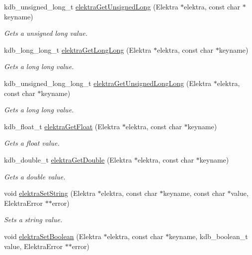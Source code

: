 \begin{DoxyCompactItemize}
kdb\+\_\+unsigned\+\_\+long\+\_\+t \hyperlink{group__highlevel_gabd5a96b1c280fcf74509b1262ee339b6}{elektra\+Get\+Unsigned\+Long} (Elektra $\ast$elektra, const char $\ast$keyname)
\begin{DoxyCompactList}\small\item\em Gets a unsigned long value. \end{DoxyCompactList}\item 
kdb\+\_\+long\+\_\+long\+\_\+t \hyperlink{group__highlevel_ga6085eb6cbf16ce5e7b0b64db0f77efea}{elektra\+Get\+Long\+Long} (Elektra $\ast$elektra, const char $\ast$keyname)
\begin{DoxyCompactList}\small\item\em Gets a long long value. \end{DoxyCompactList}\item 
kdb\+\_\+unsigned\+\_\+long\+\_\+long\+\_\+t \hyperlink{group__highlevel_gadfb09825268f0b9215d7bb27c4068e4d}{elektra\+Get\+Unsigned\+Long\+Long} (Elektra $\ast$elektra, const char $\ast$keyname)
\begin{DoxyCompactList}\small\item\em Gets a long long value. \end{DoxyCompactList}\item 
kdb\+\_\+float\+\_\+t \hyperlink{group__highlevel_gab7cb28352ab7a503c232c5dbff45ddde}{elektra\+Get\+Float} (Elektra $\ast$elektra, const char $\ast$keyname)
\begin{DoxyCompactList}\small\item\em Gets a float value. \end{DoxyCompactList}\item 
kdb\+\_\+double\+\_\+t \hyperlink{group__highlevel_ga878f4ef3ecbfacca6afbdb97c1da7943}{elektra\+Get\+Double} (Elektra $\ast$elektra, const char $\ast$keyname)
\begin{DoxyCompactList}\small\item\em Gets a double value. \end{DoxyCompactList}\item 
void \hyperlink{group__highlevel_ga563a695658e8e6f74183cca674edd1a7}{elektra\+Set\+String} (Elektra $\ast$elektra, const char $\ast$keyname, const char $\ast$value, Elektra\+Error $\ast$$\ast$error)
\begin{DoxyCompactList}\small\item\em Sets a string value. \end{DoxyCompactList}\item 
void \hyperlink{group__highlevel_ga3d703756b43b1ca85296f894e80e22e2}{elektra\+Set\+Boolean} (Elektra $\ast$elektra, const char $\ast$keyname, kdb\+\_\+boolean\+\_\+t value, Elektra\+Error $\ast$$\ast$error)

\end{DoxyCompactItemize}
